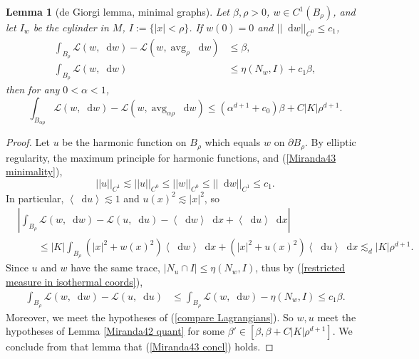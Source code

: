 \documentclass[reqno,10pt]{amsart}
\DeclareMathOperator{\avg}{avg}
\DeclareMathOperator{\diam}{diam}
\DeclareMathOperator{\Exc}{Exc}
\newcommand*\dif{\mathop{}\!\mathrm{d}}
\newcommand{\Lagrange}{\mathscr L}
\def\Japan#1{\left \langle #1 \right \rangle}
\newtheorem{lemma}[theorem]{Lemma}
\theoremstyle{definition}
\numberwithin{equation}{section}
\begin{document}
\begin{lemma}[de Giorgi lemma, minimal graphs]\label{Miranda43}
Let $\beta, \rho > 0$, $w \in C^1(B_\rho)$, and let $I_w$ be the cylinder in $M$, $I := \{|x| < \rho\}$.
If $w(0) = 0$ and $||\dif w||_{C^0} \leq c_1$,
\begin{align}
\int_{B_\rho} \Lagrange(w, \dif w) - \Lagrange(w, \avg_\rho \dif w) &\leq \beta \label{Miranda43 oscillation}, \\
\int_{B_\rho} \Lagrange(w, \dif w) &\leq \eta(N_w, I) + c_1 \beta \label{Miranda43 minimality},
\end{align}
then for any $0 < \alpha < 1$,
\begin{equation}\label{Miranda43 concl}
\int_{B_{\alpha \rho}} \Lagrange(w, \dif w) - \Lagrange(w, \avg_{\alpha \rho} \dif w) \leq (\alpha^{d + 1} + c_0) \beta + C|K|\rho^{d + 1}.
\end{equation}
\end{lemma}
\begin{proof}
Let $u$ be the harmonic function on $B_\rho$ which equals $w$ on $\partial B_\rho$.
By elliptic regularity, the maximum principle for harmonic functions, and (\ref{Miranda43 minimality}),
$$||u||_{C^1} \lesssim ||u||_{C^0} \leq ||w||_{C^0} \leq ||\dif w||_{C^1} \leq c_1.$$
In particular, $\Japan{\dif u} \lesssim 1$ and $u(x)^2 \lesssim |x|^2$, so
\begin{align*}
&\left|\int_{B_\rho} \Lagrange(w, \dif w) - \Lagrange(u, \dif u) - \Japan{\dif w} \dif x + \Japan{\dif u} \dif x\right| \\
&\qquad \leq |K| \int_{B_\rho} (|x|^2 + w(x)^2) \Japan{\dif w} \dif x + (|x|^2 + u(x)^2) \Japan{\dif u} \dif x 
\lesssim_d |K| \rho^{d + 1}.
\end{align*}
Since $u$ and $w$ have the same trace, $|N_u \cap I| \leq \eta(N_w, I)$, thus by (\ref{restricted measure in isothermal coords}),
\begin{align*}
\int_{B_\rho} \Lagrange(w, \dif w) - \Lagrange(u, \dif u) &\leq \int_{B_\rho} \Lagrange(w, \dif w) - \eta(N_w, I) \leq c_1 \beta.
\end{align*}
Moreover, we meet the hypotheses of (\ref{compare Lagrangians}).
So $w, u$ meet the hypotheses of Lemma \ref{Miranda42 quant} for some $\beta' \in [\beta, \beta + C|K|\rho^{d + 1}]$. 
We conclude from that lemma that (\ref{Miranda43 concl}) holds.
\end{proof}


\end{document}
